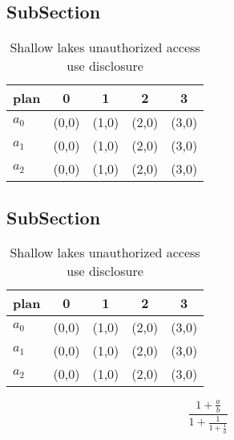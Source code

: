 \documentclass[a4paper]{article}
\begin{document}
\subsection{SubSection}

\begin{table}
\begin{adjustbox}{width=0.6\columnwidth}
\begin{tabular}{|l|l|l|l|l|}
\hline
\textbf{plan} & \multicolumn{1}{c|}{\textbf{0}} & \multicolumn{1}{c|}{\textbf{1}} & \multicolumn{1}{c|}{\textbf{2}} & \multicolumn{1}{c|}{\textbf{3}} \\ \hline
\textbf{$a_0$}  & (0,0) & (1,0) & (2,0) & (3,0) \\ \hline
\textbf{$a_1$}  & (0,0) & (1,0) & (2,0) & (3,0) \\ \hline
\textbf{$a_2$}  & (0,0) & (1,0) & (2,0) & (3,0) \\ \hline
\end{tabular}
\end{adjustbox}
\caption{Shallow lakes unauthorized access use disclosure 
}
\end{table}

\subsection{SubSection}

\begin{table}
\begin{adjustbox}{width=0.6\columnwidth}
\begin{tabular}{|l|l|l|l|l|}
\hline
\textbf{plan} & \multicolumn{1}{c|}{\textbf{0}} & \multicolumn{1}{c|}{\textbf{1}} & \multicolumn{1}{c|}{\textbf{2}} & \multicolumn{1}{c|}{\textbf{3}} \\ \hline
\textbf{$a_0$}  & (0,0) & (1,0) & (2,0) & (3,0) \\ \hline
\textbf{$a_1$}  & (0,0) & (1,0) & (2,0) & (3,0) \\ \hline
\textbf{$a_2$}  & (0,0) & (1,0) & (2,0) & (3,0) \\ \hline
\end{tabular}
\end{adjustbox}
\caption{Shallow lakes unauthorized access use disclosure 
}
\end{table}

\[ \frac{1+\frac{a}{b}}{1+\frac{1}{1+\frac{1}{a}}} \]
\end{document}

